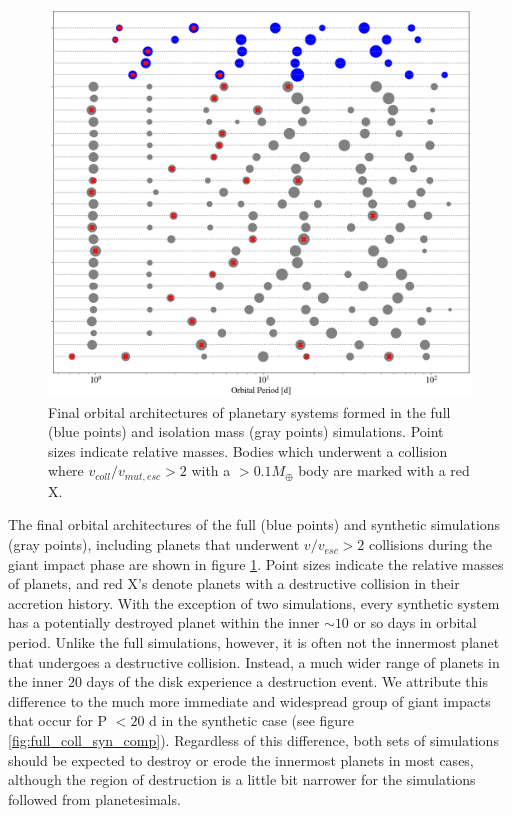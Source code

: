 \begin{figure}
\begin{center}
    \includegraphics[width=\textwidth]{figures/stip/architectures_syn_comp.png}
    \caption{Final orbital architectures of planetary systems formed in the full (blue points) and isolation mass (gray points) simulations. Point sizes indicate relative masses. Bodies which underwent a collision where $v_{coll}/v_{mut,esc} > 2$ with a $> 0.1 M_{\oplus}$ body are marked with a red X.\label{fig:architectures_syn_comp}}
\end{center}
\end{figure}

The final orbital architectures of the full (blue points) and synthetic simulations (gray points), including planets that underwent $v/v_{esc} > 2$ collisions during the giant impact phase are shown in figure \ref{fig:architectures_syn_comp}. Point sizes indicate the relative masses of planets, and red X's denote planets with a destructive collision in their accretion history. With the exception of two simulations, every synthetic system has a potentially destroyed planet within the inner $\sim 10$ or so days in orbital period. Unlike the full simulations, however, it is often not the innermost planet that undergoes a destructive collision. Instead, a much wider range of planets in the inner 20 days of the disk experience a destruction event. We attribute this difference to the much more immediate and widespread group of giant impacts that occur for P $< 20$ d in the synthetic case (see figure \ref{fig:full_coll_syn_comp}). Regardless of this difference, both sets of simulations should be expected to destroy or erode the innermost planets in most cases, although the region of destruction is a little bit narrower for the simulations followed from planetesimals.


